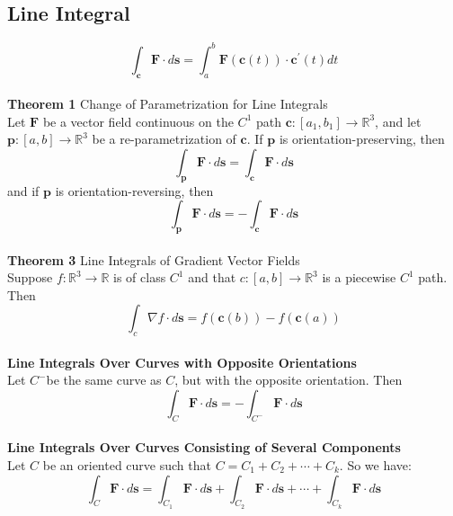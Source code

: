 \documentclass[11pt]{article}
\begin{document}
\subsection{Line Integral}
\[\int_{\mathbf{c}} \mathbf{F} \cdot d \mathbf{s}=\int_{a}^{b} \mathbf{F}(\mathbf{c}(t)) \cdot \mathbf{c}^{\prime}(t) dt\]
\\
\textbf{Theorem 1}
Change of Parametrization for Line Integrals \\ 
Let $\mathbf{F}$ be a vector field continuous on the $C^{1}$ path $\mathbf{c}:\left[a_{1}, b_{1}\right] \rightarrow \mathbb{R}^{3}$, and let $\mathbf{p}:[a, b] \rightarrow \mathbb{R}^{3}$ be a re-parametrization of $\mathbf{c}$. If $\mathbf{p}$ is orientation-preserving, then
$$
\int_{\mathbf{p}} \mathbf{F} \cdot d \mathbf{s}=\int_{\mathbf{c}} \mathbf{F} \cdot d \mathbf{s}
$$
and if $\mathbf{p}$ is orientation-reversing, then
$$
\int_{\mathbf{p}} \mathbf{F} \cdot d \mathbf{s}=-\int_{\mathbf{c}} \mathbf{F} \cdot d\mathbf{s}
$$
\\
\textbf{Theorem 3} Line Integrals of Gradient Vector Fields \\
Suppose $f: \mathbb{R}^{3} \rightarrow \mathbb{R}$ is of class $C^{1}$ and that $c:[a, b] \rightarrow \mathbb{R}^{3}$ is a piecewise $C^{1}$ path. Then
$$
\int_{c} \nabla f \cdot d \mathbf{s}=f(\mathbf{c}(b))-f(\mathbf{c}(a))
$$
\\
\textbf{Line Integrals Over Curves with Opposite Orientations}\\
 Let $C^{-}$be the same curve as $C$, but with the opposite orientation. Then
$$
\int_{C} \mathbf{F} \cdot d \mathbf{s}=-\int_{C^{-}} \mathbf{F} \cdot d \mathbf{s}
$$
\\
\textbf{Line Integrals Over Curves Consisting of Several Components}\\ 
Let $C$ be an oriented curve such that $C=C_{1}+C_{2}+\cdots+C_{k}$. So we have:
$$
\int_{C} \mathbf{F} \cdot d \mathbf{s}=\int_{C_{1}} \mathbf{F} \cdot d \mathbf{s}+\int_{C_{2}} \mathbf{F} \cdot d \mathbf{s}+\cdots+\int_{C_{k}} \mathbf{F} \cdot d \mathbf{s}
$$
\newpage
\end{document}

